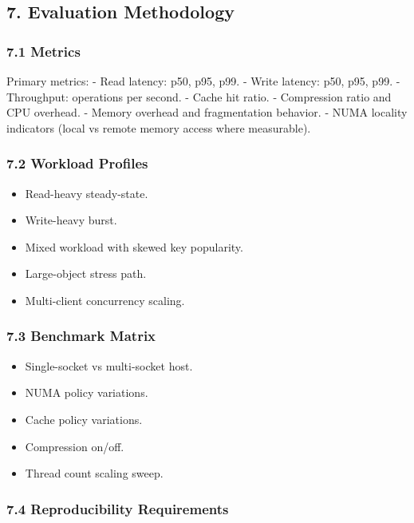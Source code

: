 \documentclass[
  english,
  letterpaper,
  DIV=11,
  numbers=noendperiod]{scrartcl}
\providecommand{\tightlist}{%
  \setlength{\itemsep}{0pt}\setlength{\parskip}{0pt}}
\begin{document}
\subsection{7. Evaluation Methodology}\label{evaluation-methodology}

\subsubsection{7.1 Metrics}\label{metrics}

Primary metrics: - Read latency: p50, p95, p99. - Write latency: p50,
p95, p99. - Throughput: operations per second. - Cache hit ratio. -
Compression ratio and CPU overhead. - Memory overhead and fragmentation
behavior. - NUMA locality indicators (local vs remote memory access
where measurable).

\subsubsection{7.2 Workload Profiles}\label{workload-profiles}

\begin{itemize}
\tightlist
\item
  Read-heavy steady-state.
\item
  Write-heavy burst.
\item
  Mixed workload with skewed key popularity.
\item
  Large-object stress path.
\item
  Multi-client concurrency scaling.
\end{itemize}

\subsubsection{7.3 Benchmark Matrix}\label{benchmark-matrix}

\begin{itemize}
\tightlist
\item
  Single-socket vs multi-socket host.
\item
  NUMA policy variations.
\item
  Cache policy variations.
\item
  Compression on/off.
\item
  Thread count scaling sweep.
\end{itemize}

\subsubsection{7.4 Reproducibility
Requirements}\label{reproducibility-requirements}
\end{document}
